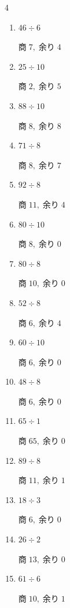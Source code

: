 \begin{multicols}{4}
\begin{enumerate}
\columnbreak %

  \item $46 \div 6$

        $商\; 7,\; 余り\; 4$

  \item $25 \div 10$

        $商\; 2,\; 余り\; 5$

  \item $88 \div 10$

        $商\; 8,\; 余り\; 8$

  \item $71 \div 8$

        $商\; 8,\; 余り\; 7$

  \item $92 \div 8$

        $商\; 11,\; 余り\; 4$

  \item $80 \div 10$

        $商\; 8,\; 余り\; 0$

  \item $80 \div 8$

        $商\; 10,\; 余り\; 0$

  \item $52 \div 8$

        $商\; 6,\; 余り\; 4$

  \item $60 \div 10$

        $商\; 6,\; 余り\; 0$

  \item $48 \div 8$

        $商\; 6,\; 余り\; 0$

  \item $65 \div 1$

        $商\; 65,\; 余り\; 0$

  \item $89 \div 8$

        $商\; 11,\; 余り\; 1$

  \item $18 \div 3$

        $商\; 6,\; 余り\; 0$

  \item $26 \div 2$

        $商\; 13,\; 余り\; 0$

  \item $61 \div 6$

        $商\; 10,\; 余り\; 1$


\end{enumerate}
\end{multicols}

